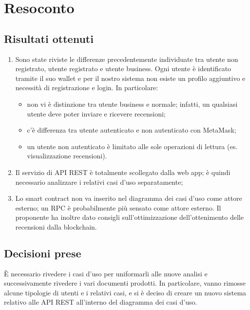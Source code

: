 \section{Resoconto}

\subsection{Risultati ottenuti}

\begin{enumerate}
    \item Sono state riviste le differenze precedentemente individuate tra utente non
          registrato, utente registrato e utente business. Ogni utente è identificato
          tramite il suo wallet e per il nostro sistema non esiste un profilo aggiuntivo
          e necessità di registrazione e login. In particolare:
          \begin{itemize}
              \item non vi è distinzione tra utente business e normale; infatti, un qualsiasi
                    utente deve poter inviare e ricevere recensioni;
              \item c'è differenza tra utente autenticato e non autenticato con MetaMask;
              \item un utente non autenticato è limitato alle sole operazioni di lettura (es.
                    visualizzazione recensioni).
          \end{itemize}
    \item Il servizio di API REST è totalmente scollegato dalla web app; è quindi
          necessario analizzare i relativi casi d'uso separatamente;
    \item Lo smart contract non va inserito nel diagramma dei casi d'uso come attore
          esterno; un RPC è probabilmente più sensato come attore esterno. Il proponente
          ha inoltre dato consigli sull'ottimizzazione dell'ottenimento delle recensioni
          dalla blockchain.
\end{enumerate}

\subsection{Decisioni prese}
È necessario rivedere i casi d'uso per uniformarli alle nuove analisi e successivamente rivedere i vari documenti prodotti. In particolare, vanno rimosse alcune tipologie di utenti e i relativi casi, e si è deciso di creare un nuovo sistema relativo alle API REST all'interno del diagramma dei casi d'uso.